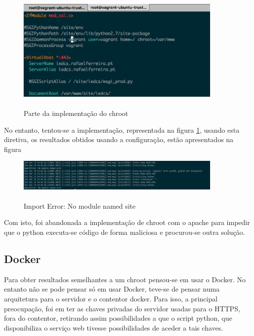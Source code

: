 \documentclass[pdftex,12pt,a4paper]{report}
\begin{document}
\begin{figure}[!htb]
\center
 \includegraphics[width=100mm,scale=1]{apache_chroot_config.png}
 \caption{\\Parte da implementação do chroot}
 \label{fig:apache_chroot_config}
\end{figure}

No entanto, tentou-se a implementação, representada na figura \ref{fig:apache_chroot_config}, usando esta diretiva, os resultados obtidos usando a configuração, estão apresentados na figura ~ 

\begin{figure}[!htb]
\center
 \includegraphics[width=100mm,scale=1]{import_error.png}
 \caption{\\Import Error: No module named site}
 \label{fig:import_Error}
\end{figure}

Com isto, foi abandonada a implementação de chroot com o apache para impedir que o python executa-se código de forma maliciosa e procurou-se outra solução.

\newpage
\subsection{Docker}
Para obter resultados semelhantes a um chroot pensou-se em usar o Docker. No entanto não se pode pensar só em usar Docker, teve-se de pensar numa arquitetura para o servidor e o contentor docker. Para isso, a principal preocupação, foi em ter as chaves privadas do servidor usadas para o HTTPS, fora do contentor, retirando assim possibilidades a que o script python, que disponibiliza o serviço web tivesse possibilidades de aceder a tais chaves.
\end{document}
